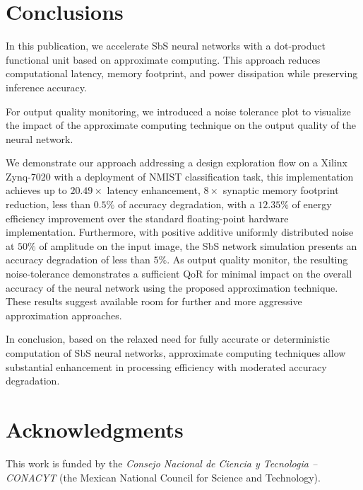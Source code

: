 \section{Conclusions}
\label{sec:conclusions}
In this publication, we accelerate SbS neural networks with a dot-product functional unit based on approximate computing. This approach reduces computational latency, memory footprint, and power dissipation while preserving inference accuracy.

For output quality monitoring, we introduced a noise tolerance plot to visualize the impact of the approximate computing technique on the output quality of the neural network.

We demonstrate our approach addressing a design exploration flow on a Xilinx Zynq-7020 with a deployment of NMIST classification task, this implementation achieves up to $20.49\times$ latency enhancement, $8\times$ synaptic memory footprint reduction, less than $0.5\%$ of accuracy degradation, with a $12.35\%$ of energy efficiency improvement over the standard floating-point hardware implementation. Furthermore, with positive additive uniformly distributed noise at $50\%$ of amplitude on the input image, the SbS network simulation presents an accuracy degradation of less than $5\%$. As output quality monitor, the resulting noise-tolerance demonstrates a sufficient QoR for minimal impact on the overall accuracy of the neural network using the proposed approximation technique. These results suggest available room for further and more aggressive approximation approaches.

In conclusion, based on the relaxed need for fully accurate or deterministic computation of SbS neural networks, approximate computing techniques allow substantial enhancement in processing efficiency with moderated accuracy degradation.

\section * {Acknowledgments}\label{sec:Ack}
This work is funded by the \textit{Consejo Nacional de Ciencia y Tecnologia -- CONACYT} (the Mexican National Council for Science and Technology).
